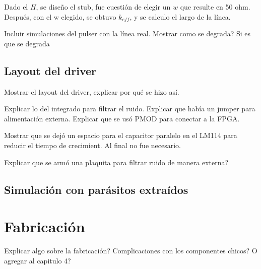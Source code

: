 Dado el $H$, se diseño el stub, fue cuestión de elegir un $w$ que resulte en 50
ohm. Después, con el w elegido, se obtuvo $k_{eff}$, y se calculo el largo de la
línea.

Incluir simulaciones del pulser con la línea real. Mostrar como se degrada? Si
es que se degrada

\subsection{Layout del driver}

Mostrar el layout del driver, explicar por qué se hizo así.

Explicar lo del integrado para filtrar el ruido. Explicar que había un jumper
para alimentación externa. Explicar que se usó PMOD para conectar a la FPGA.

Mostrar que se dejó un espacio para el capacitor paralelo en el LM114 para
reducir el tiempo de crecimient. Al final no fue necesario.

Explicar que se armó una plaquita para filtrar ruido de manera externa?

\subsection{Simulación con parásitos extraídos}

\section{Fabricación}

Explicar algo sobre la fabricación? Complicaciones con los componentes chicos?
O agregar al capitulo 4?
